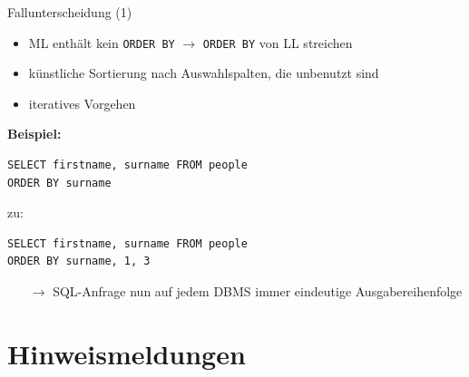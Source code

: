 \documentclass{beamer}
\begin{document}
\begin{frame}[fragile]{Fallunterscheidung (1)}
\begin{itemize}
\item ML enthält kein \verb|ORDER BY| $\to$ \verb|ORDER BY| von LL streichen
\item künstliche Sortierung nach Auswahlspalten, die unbenutzt sind
\item iteratives Vorgehen
\end{itemize}
\textbf{Beispiel:}\\
\begin{verbatim}
SELECT firstname, surname FROM people 
ORDER BY surname
\end{verbatim}\pause
zu:
\begin{verbatim}
SELECT firstname, surname FROM people 
ORDER BY surname, 1, 3
\end{verbatim}
\begin{itemize}
\item[$\to$] SQL-Anfrage nun auf jedem DBMS immer eindeutige Ausgabereihenfolge
\end{itemize}
\end{frame}
%
%


\section{Hinweismeldungen}
\end{document}
